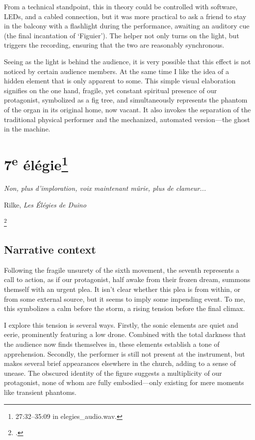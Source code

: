 \documentclass[12pt,twoside,maitrise]{dms_ks}
\theoremstyle{definition}
\begin{document}
{From a technical standpoint, this in theory could be controlled with software, LEDs, and a cabled connection, but it was more practical to ask a friend to stay in the balcony with a flashlight during the performance, awaiting an auditory cue (the final incantation of `Figuier').
The helper not only turns on the light, but triggers the recording, ensuring that the two are reasonably synchronous.

Seeing as the light is behind the audience, it is very possible that this effect is not noticed by certain audience members.
At the same time I like the idea of a hidden element that is only apparent to some.
This simple visual elaboration signifies on the one hand, fragile, yet constant spiritual presence of our protagonist, symbolized as a fig tree, and simultaneously represents the phantom of the organ in its original home, now vacant.
It also invokes the separation of the traditional physical performer and the mechanized, automated version---the ghost in the machine.

\section{7\textsuperscript{e} élégie\footnote{27:32--35:09 in elegies\_audio.wav.}}

\epigraph{\textit{Non, plus d’imploration, voix maintenant mûrie, plus de clameur...}}{Rilke, \textit{Les Élégies de Duino}\protect\footnotemark}

\footcitetext[63]{rilke_egies_1986}

\subsection{Narrative context}

Following the fragile unsurety of the sixth movement, the seventh represents a call to action, as if our protagonist, half awake from their frozen dream, summons themself with an urgent plea. 
It isn’t clear whether this plea is from within, or from some external source, but it seems to imply some impending event. 
To me, this symbolizes a calm before the storm, a rising tension before the final climax. 

I explore this tension is several ways. 
Firstly, the sonic elements are quiet and eerie, prominently featuring a low drone. 
Combined with the total darkness that the audience now finds themselves in, these elements establish a tone of apprehension.
Secondly, the performer is still not present at the instrument, but makes several brief appearances elsewhere in the church, adding to a sense of unease. 
The obscured identity of the figure suggests a multiplicity of our protagonist, none of whom are fully embodied---only existing for mere moments like transient phantoms.

}
\end{document}
